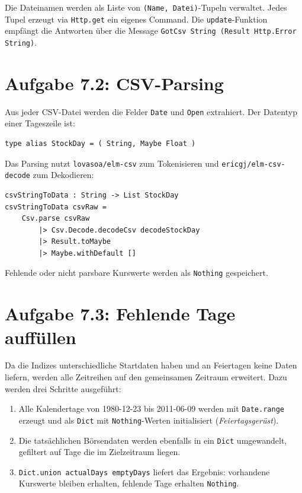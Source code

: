\documentclass[11pt,a4paper]{article}
\begin{document}
Die Dateinamen werden als Liste von \texttt{(Name, Datei)}-Tupeln verwaltet.
Jedes Tupel erzeugt via \texttt{Http.get} ein eigenes Command. Die
\texttt{update}-Funktion empfängt die Antworten über die Message
\texttt{GotCsv String (Result Http.Error String)}.

\section*{Aufgabe 7.2: CSV-Parsing}

Aus jeder CSV-Datei werden die Felder \texttt{Date} und \texttt{Open}
extrahiert. Der Datentyp einer Tageszeile ist:

\begin{verbatim}
type alias StockDay = ( String, Maybe Float )
\end{verbatim}

Das Parsing nutzt \texttt{lovasoa/elm-csv} zum Tokenisieren und
\texttt{ericgj/elm-csv-decode} zum Dekodieren:

\begin{verbatim}
csvStringToData : String -> List StockDay
csvStringToData csvRaw =
    Csv.parse csvRaw
        |> Csv.Decode.decodeCsv decodeStockDay
        |> Result.toMaybe
        |> Maybe.withDefault []
\end{verbatim}

Fehlende oder nicht parsbare Kurswerte werden als \texttt{Nothing} gespeichert.

\section*{Aufgabe 7.3: Fehlende Tage auffüllen}

Da die Indizes unterschiedliche Startdaten haben und an Feiertagen keine Daten
liefern, werden alle Zeitreihen auf den gemeinsamen Zeitraum erweitert. Dazu
werden drei Schritte ausgeführt:

\begin{enumerate}
    \item Alle Kalendertage von 1980-12-23 bis 2011-06-09 werden mit
          \texttt{Date.range} erzeugt und als \texttt{Dict} mit
          \texttt{Nothing}-Werten initialisiert (\emph{Feiertagsgerüst}).
    \item Die tatsächlichen Börsendaten werden ebenfalls in ein \texttt{Dict}
          umgewandelt, gefiltert auf Tage die im Zielzeitraum liegen.
    \item \texttt{Dict.union actualDays emptyDays} liefert das Ergebnis:
          vorhandene Kurswerte bleiben erhalten, fehlende Tage erhalten
          \texttt{Nothing}.
\end{enumerate}
\end{document}

